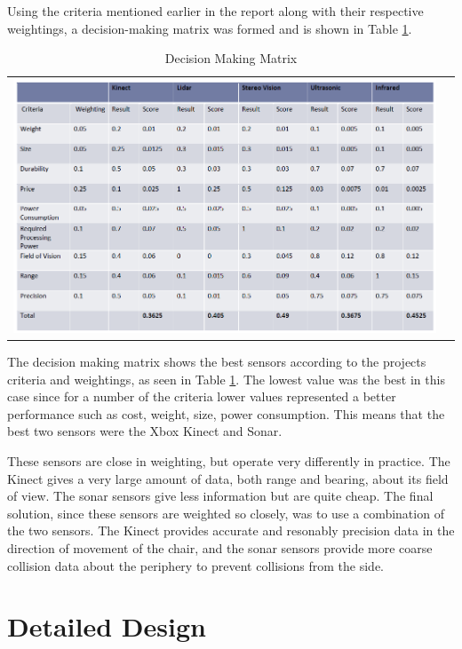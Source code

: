 \documentclass[oneside,final,a4paper]{report}
\begin{document}
Using the criteria mentioned earlier in the report along with their respective weightings, a decision-making matrix was formed and is shown in Table \ref{tab:decision_matrix}.

    \begin{table}[hbt]
        \caption{Decision Making Matrix}
        \centering
        \begin{tabular}{cc}
        \includegraphics[scale=0.35]{decision_matrix}\\
        \end{tabular}
        \label{tab:decision_matrix}
    \end{table}

The decision making matrix shows the best sensors according to the projects criteria and weightings, as seen in Table \ref{tab:decision_matrix}. The lowest value was the best in this case since for a number of the criteria lower values represented a better performance such as cost, weight, size, power consumption. This means that the best two sensors were the Xbox Kinect and Sonar. 

These sensors are close in weighting, but operate very differently in practice. The Kinect gives a very large amount of data, both range and bearing, about its field of view. The sonar sensors give less information but are quite cheap. The final solution, since these sensors are weighted so closely, was to use a combination of the two sensors. The Kinect provides accurate and resonably precision data in the direction of movement of the chair, and the sonar sensors provide more coarse collision data about the periphery to prevent collisions from the side.

\chapter{Detailed Design}
\end{document}
